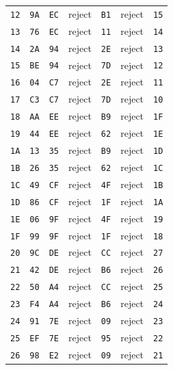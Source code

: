 \begin{longtable}{lllllll}
\texttt{12} & \texttt{9A} & \texttt{EC} & reject & \texttt{B1} & reject & \texttt{15}\\
\texttt{13} & \texttt{76} & \texttt{EC} & reject & \texttt{11} & reject & \texttt{14}\\
\texttt{14} & \texttt{2A} & \texttt{94} & reject & \texttt{2E} & reject & \texttt{13}\\
\texttt{15} & \texttt{BE} & \texttt{94} & reject & \texttt{7D} & reject & \texttt{12}\\
\texttt{16} & \texttt{04} & \texttt{C7} & reject & \texttt{2E} & reject & \texttt{11}\\
\texttt{17} & \texttt{C3} & \texttt{C7} & reject & \texttt{7D} & reject & \texttt{10}\\
\texttt{18} & \texttt{AA} & \texttt{EE} & reject & \texttt{B9} & reject & \texttt{1F}\\
\texttt{19} & \texttt{44} & \texttt{EE} & reject & \texttt{62} & reject & \texttt{1E}\\
\texttt{1A} & \texttt{13} & \texttt{35} & reject & \texttt{B9} & reject & \texttt{1D}\\
\texttt{1B} & \texttt{26} & \texttt{35} & reject & \texttt{62} & reject & \texttt{1C}\\
\texttt{1C} & \texttt{49} & \texttt{CF} & reject & \texttt{4F} & reject & \texttt{1B}\\
\texttt{1D} & \texttt{86} & \texttt{CF} & reject & \texttt{1F} & reject & \texttt{1A}\\
\texttt{1E} & \texttt{06} & \texttt{9F} & reject & \texttt{4F} & reject & \texttt{19}\\
\texttt{1F} & \texttt{99} & \texttt{9F} & reject & \texttt{1F} & reject & \texttt{18}\\
\texttt{20} & \texttt{9C} & \texttt{DE} & reject & \texttt{CC} & reject & \texttt{27}\\
\texttt{21} & \texttt{42} & \texttt{DE} & reject & \texttt{B6} & reject & \texttt{26}\\
\texttt{22} & \texttt{50} & \texttt{A4} & reject & \texttt{CC} & reject & \texttt{25}\\
\texttt{23} & \texttt{F4} & \texttt{A4} & reject & \texttt{B6} & reject & \texttt{24}\\
\texttt{24} & \texttt{91} & \texttt{7E} & reject & \texttt{09} & reject & \texttt{23}\\
\texttt{25} & \texttt{EF} & \texttt{7E} & reject & \texttt{95} & reject & \texttt{22}\\
\texttt{26} & \texttt{98} & \texttt{E2} & reject & \texttt{09} & reject & \texttt{21}\\

\end{longtable}
